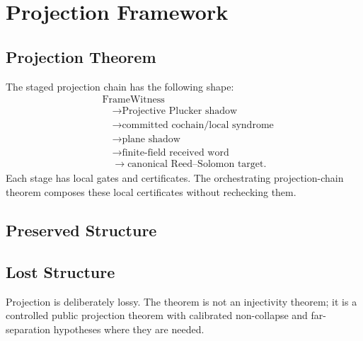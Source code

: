 \section{Projection Framework}

\subsection{Projection Theorem}

The staged projection chain has the following shape:
\[
\begin{aligned}
  &\text{FrameWitness} \\
  &\quad\to \text{Projective Plucker shadow} \\
  &\quad\to \text{committed cochain/local syndrome} \\
  &\quad\to \text{plane shadow} \\
  &\quad\to \text{finite-field received word} \\
  &\quad\to \text{canonical Reed--Solomon target}.
\end{aligned}
\]
Each stage has local gates and certificates. The orchestrating projection-chain
theorem composes these local certificates without rechecking them.

\subsection{Preserved Structure}


\subsection{Lost Structure}

Projection is deliberately lossy. The theorem is not an injectivity theorem; it
is a controlled public projection theorem with calibrated non-collapse and
far-separation hypotheses where they are needed.
